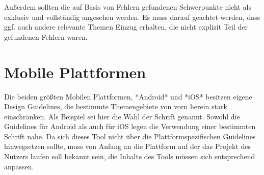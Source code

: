 Außerdem sollten die auf Basis von Fehlern gefundenen Schwerpunkte nicht als exklusiv und vollständig angesehen werden. Es muss darauf geachtet werden, dass ggf. auch andere relevante Themen Einzug erhalten, die nicht explizit Teil der gefundenen Fehlern waren.


\section{Mobile Plattformen}
Die beiden größten Mobilen Plattformen, *Android* und *iOS* besitzen eigene Design Guidelines, die bestimmte Themengebiete von vorn herein stark einschränken.
Als Beispiel sei hier die Wahl der Schrift genannt. Sowohl die Guidelines für Android als auch für iOS legen die Verwendung einer bestimmten Schrift nahe.
Da sich dieses Tool nicht über die Plattformspezifischen Guidelines hinwegsetzen sollte, muss von Anfang an die Plattform  auf der das Projekt des Nutzers laufen soll bekannt sein, die Inhalte des Tools müssen sich entsprechend anpassen.


\clearpage
